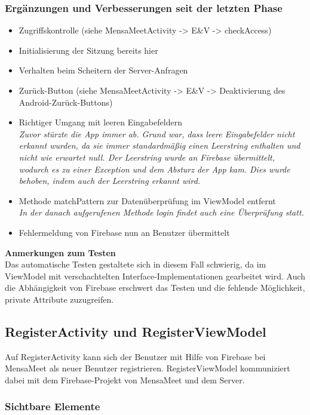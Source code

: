 \documentclass[a4paper]{scrreprt}
\begin{document}
\subsubsection{Ergänzungen und Verbesserungen seit der letzten Phase}
\begin{itemize}
\item Zugriffskontrolle (siehe MensaMeetActivity -> E\&V -> checkAccess)
\item Initialisierung der Sitzung bereits hier
\item Verhalten beim Scheitern der Server-Anfragen
\item Zurück-Button (siehe MensaMeetActivity -> E\&V -> Deaktivierung des Android-Zurück-Buttons)
\item Richtiger Umgang mit leeren Eingabefeldern\\
\textit{Zuvor stürzte die App immer ab. Grund war, dass leere Eingabefelder nicht erkannt wurden, da sie immer standardmäßig einen Leerstring enthalten und nicht wie erwartet null. Der Leerstring wurde an Firebase übermittelt, wodurch es zu einer Exception und dem Absturz der App kam. Dies wurde behoben, indem auch der Leerstring erkannt wird.}
\item Methode matchPattern zur Datenüberprüfung im ViewModel entfernt\\
\textit{In der danach aufgerufenen Methode login findet auch eine Überprüfung statt.}
\item Fehlermeldung von Firebase nun an Benutzer übermittelt

\end{itemize}

\textbf{Anmerkungen zum Testen} \\
Das automatische Testen gestaltete sich in diesem Fall schwierig, da im ViewModel mit verschachtelten Interface-Implementationen gearbeitet wird. Auch die Abhängigkeit von Firebase erschwert das Testen und die fehlende Möglichkeit, private Attribute zuzugreifen.


\subsection{RegisterActivity und RegisterViewModel}
Auf RegisterActivity kann sich der Benutzer mit Hilfe von Firebase bei MensaMeet als neuer Benutzer registrieren. RegisterViewModel kommuniziert dabei mit dem Firebase-Projekt von MensaMeet und dem Server.

\subsubsection{Sichtbare Elemente}
\end{document}
